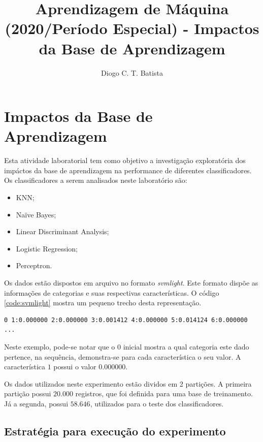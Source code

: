 \documentclass[12pt]{article}
\title{Aprendizagem de Máquina (2020/Período Especial) - Impactos da Base de Aprendizagem}
\author{Diogo C. T. Batista\inst{1}}
\begin{document}
\maketitle

\section{Impactos da Base de Aprendizagem}

Esta atividade laboratorial tem como objetivo a investigação exploratória dos impáctos da base de aprendizagem na performance de diferentes classificadores. Os classificadores a serem analisados neste laboratório são:

\begin{itemize}
  \item KNN;
  \item Naïve Bayes;
  \item Linear Discriminant Analysis;
  \item Logistic Regression;
  \item Perceptron.
\end{itemize}

Os dados estão dispostos em arquivo no formato \textit{svmlight}. Este formato dispõe as informações de categorias e suas respectivas características. O código \ref{code:svmlight} mostra um pequeno trecho desta representação.

\begin{lstlisting}[caption={Exemplo do Formato de Entrada},captionpos=b,frame=single,label={code:svmlight}]
0 1:0.000000 2:0.000000 3:0.001412 4:0.000000 5:0.014124 6:0.000000 ...
\end{lstlisting}

Neste exemplo, pode-se notar que o $0$ inicial mostra a qual categoria este dado pertence, na sequência, demonstra-se para cada característica o seu valor. A característica $1$ possui o valor $0.000000$.

Os dados utilizados neste experimento estão dividos em 2 partições. A primeira partição possui $20.000$ registros, que foi definida para uma base de treinamento. Já a segunda, possui $58.646$, utilizados para o teste dos classificadores.

\newpage

\subsection{Estratégia para execução do experimento}
\end{document}
